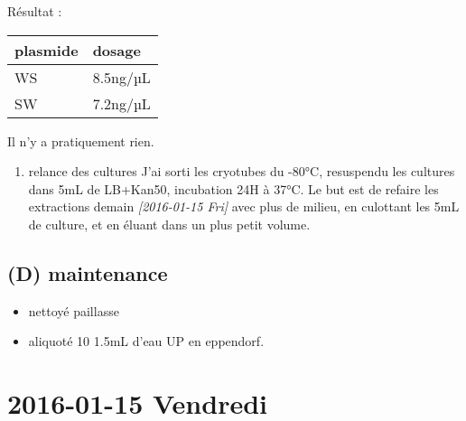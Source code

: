 \documentclass[9pt, oneside, twocolumn]{scrartcl}
\begin{document}
Résultat :
\begin{center}
\begin{tabular}{ll}
\toprule
plasmide & dosage\\
\midrule
WS & 8.5ng/µL\\
SW & 7.2ng/µL\\
\bottomrule
\end{tabular}
\end{center}

Il n'y a pratiquement rien. 

\begin{enumerate}
\item relance des cultures
\label{sec:orgheadline35}
J'ai sorti les cryotubes du -80°C, resuspendu les cultures dans 5mL de LB+Kan50,
incubation 24H à 37°C. Le but est de refaire les extractions demain
\textit{[2016-01-15 Fri] } avec plus de milieu, en culottant les 5mL de culture, et en
éluant dans un plus petit volume.
\end{enumerate}

\subsection{(D) maintenance}
\label{sec:orgheadline37}
\begin{itemize}
\item nettoyé paillasse
\item aliquoté 10 \texttimes{} 1.5mL d'eau UP en eppendorf.
\end{itemize}
\section{2016-01-15 Vendredi}
\label{sec:orgheadline44}
\end{document}
